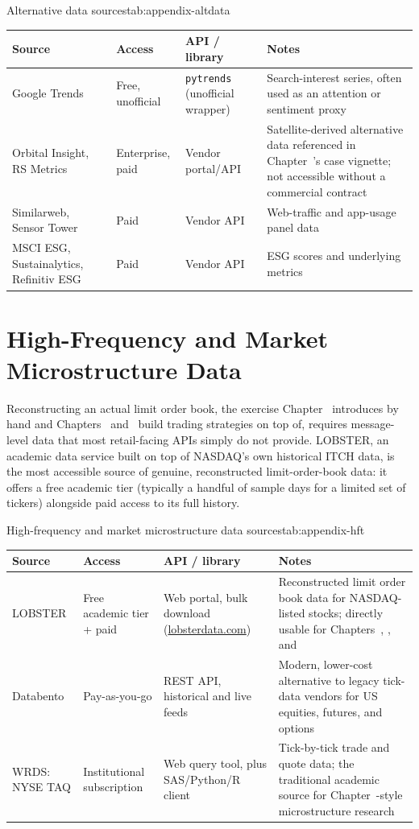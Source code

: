 \documentclass[../ai_in_finance]{subfiles}
\begin{document}
\begin{booktable}[htbp]{Alternative data sources}{tab:appendix-altdata}
\begin{tabular}{L{3.0cm}L{2.6cm}L{3.6cm}L{3.2cm}}
\toprule
Source & Access & API / library & Notes \\
\midrule
Google Trends & Free, unofficial & \texttt{pytrends} (unofficial wrapper) & Search-interest series, often used as an attention or sentiment proxy \\
Orbital Insight, RS Metrics & Enterprise, paid & Vendor portal/API & Satellite-derived alternative data referenced in Chapter~'s case vignette; not accessible without a commercial contract \\
Similarweb, Sensor Tower & Paid & Vendor API & Web-traffic and app-usage panel data \\
MSCI ESG, Sustainalytics, Refinitiv ESG & Paid & Vendor API & ESG scores and underlying metrics \\
\bottomrule
\end{tabular}
\end{booktable}

\section{High-Frequency and Market Microstructure Data}

Reconstructing an actual limit order book, the exercise Chapter~ introduces by hand and Chapters~ and~ build trading strategies on top of, requires message-level data that most retail-facing APIs simply do not provide. LOBSTER, an academic data service built on top of NASDAQ's own historical ITCH data, is the most accessible source of genuine, reconstructed limit-order-book data: it offers a free academic tier (typically a handful of sample days for a limited set of tickers) alongside paid access to its full history.

\begin{booktable}[htbp]{High-frequency and market microstructure data sources}{tab:appendix-hft}
\begin{tabular}{L{3.0cm}L{2.6cm}L{3.6cm}L{3.2cm}}
\toprule
Source & Access & API / library & Notes \\
\midrule
LOBSTER & Free academic tier + paid & Web portal, bulk download (\url{lobsterdata.com}) & Reconstructed limit order book data for NASDAQ-listed stocks; directly usable for Chapters~, , and  \\
Databento & Pay-as-you-go & REST API, historical and live feeds & Modern, lower-cost alternative to legacy tick-data vendors for US equities, futures, and options \\
WRDS: NYSE TAQ & Institutional subscription & Web query tool, plus SAS/Python/R client & Tick-by-tick trade and quote data; the traditional academic source for Chapter~-style microstructure research \\
\bottomrule
\end{tabular}
\end{booktable}
\end{document}
